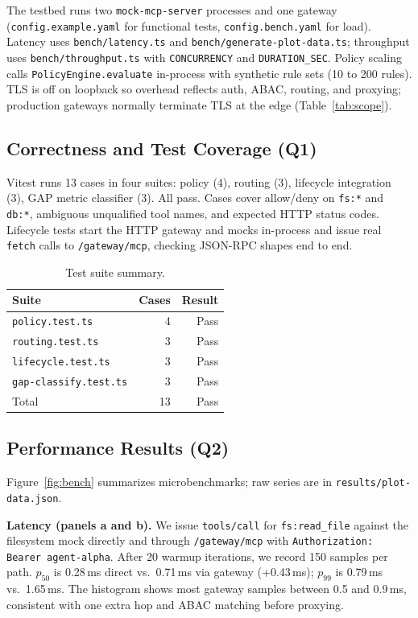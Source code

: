 \documentclass[11pt]{article}
\newcommand{\code}[1]{\texttt{#1}}
\begin{document}
The testbed runs two \code{mock-mcp-server} processes and one gateway (\code{config.example.yaml} for functional tests, \code{config.bench.yaml} for load).
Latency uses \code{bench/latency.ts} and \code{bench/generate-plot-data.ts}; throughput uses \code{bench/throughput.ts} with \code{CONCURRENCY} and \code{DURATION\_SEC}.
Policy scaling calls \code{PolicyEngine.evaluate} in-process with synthetic rule sets (10 to 200 rules).
TLS is off on loopback so overhead reflects auth, ABAC, routing, and proxying; production gateways normally terminate TLS at the edge (Table~\ref{tab:scope}).

\subsection{Correctness and Test Coverage (Q1)}

Vitest runs 13 cases in four suites: policy (4), routing (3), lifecycle integration (3), GAP metric classifier (3).
All pass.
Cases cover allow/deny on \code{fs:*} and \code{db:*}, ambiguous unqualified tool names, and expected HTTP status codes.
Lifecycle tests start the HTTP gateway and mocks in-process and issue real \code{fetch} calls to \code{/gateway/mcp}, checking JSON-RPC shapes end to end.

\begin{table}[H]
\centering
\caption{Test suite summary.}
\label{tab:tests}
\small
\begin{tabular}{@{}lrr@{}}
\toprule
Suite & Cases & Result \\
\midrule
\code{policy.test.ts} & 4 & Pass \\
\code{routing.test.ts} & 3 & Pass \\
\code{lifecycle.test.ts} & 3 & Pass \\
\code{gap-classify.test.ts} & 3 & Pass \\
\midrule
Total & 13 & Pass \\
\bottomrule
\end{tabular}
\end{table}

\subsection{Performance Results (Q2)}

Figure~\ref{fig:bench} summarizes microbenchmarks; raw series are in \code{results/plot-data.json}.

\textbf{Latency (panels a and b).}
We issue \code{tools/call} for \code{fs:read\_file} against the filesystem mock directly and through \code{/gateway/mcp} with \code{Authorization: Bearer agent-alpha}.
After 20 warmup iterations, we record 150 samples per path.
$p_{50}$ is 0.28\,ms direct vs.\ 0.71\,ms via gateway (+0.43\,ms); $p_{99}$ is 0.79\,ms vs.\ 1.65\,ms.
The histogram shows most gateway samples between 0.5 and 0.9\,ms, consistent with one extra hop and ABAC matching before proxying.
\end{document}
